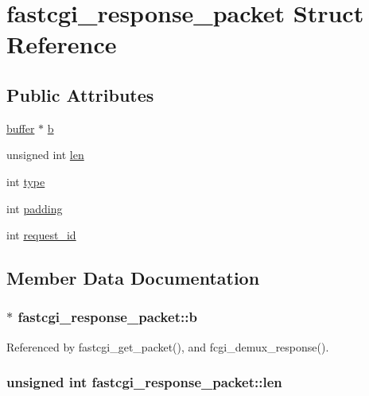 \hypertarget{structfastcgi__response__packet}{\section{fastcgi\-\_\-response\-\_\-packet Struct Reference}
\label{structfastcgi__response__packet}
}
\subsection*{Public Attributes}
\begin{DoxyCompactItemize}
\item 
\hyperlink{structbuffer}{buffer} $\ast$ \hyperlink{structfastcgi__response__packet_a3d758cf4fbfe23be9cfc33f0a037fc31}{b}
\item 
unsigned int \hyperlink{structfastcgi__response__packet_a734b0438fe1312304f52a711ac00f93f}{len}
\item 
int \hyperlink{structfastcgi__response__packet_afcc41536898c559b3e5d1a0552480b6a}{type}
\item 
int \hyperlink{structfastcgi__response__packet_a65c16422e8ed31cf27f1c0a15606e7f3}{padding}
\item 
int \hyperlink{structfastcgi__response__packet_a9aa104731c6ac900bb4f26ba1489f140}{request\-\_\-id}
\end{DoxyCompactItemize}


\subsection{Member Data Documentation}
\hypertarget{structfastcgi__response__packet_a3d758cf4fbfe23be9cfc33f0a037fc31}{
\subsubsection[{b}]{$\ast$ fastcgi\-\_\-response\-\_\-packet\-::b}}\label{structfastcgi__response__packet_a3d758cf4fbfe23be9cfc33f0a037fc31}


Referenced by fastcgi\-\_\-get\-\_\-packet(), and fcgi\-\_\-demux\-\_\-response().

\hypertarget{structfastcgi__response__packet_a734b0438fe1312304f52a711ac00f93f}{
\subsubsection[{len}]{\setlength{\rightskip}{0pt plus 5cm}unsigned int fastcgi\-\_\-response\-\_\-packet\-::len}}\label{structfastcgi__response__packet_a734b0438fe1312304f52a711ac00f93f}


